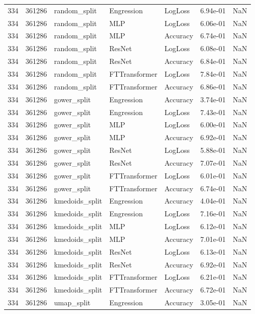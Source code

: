 \begin{tabular}{rrlllrr}
334 & 361286 & random\_split & Engression & LogLoss & 6.94e-01 & NaN \\
334 & 361286 & random\_split & MLP & LogLoss & 6.06e-01 & NaN \\
334 & 361286 & random\_split & MLP & Accuracy & 6.74e-01 & NaN \\
334 & 361286 & random\_split & ResNet & LogLoss & 6.08e-01 & NaN \\
334 & 361286 & random\_split & ResNet & Accuracy & 6.84e-01 & NaN \\
334 & 361286 & random\_split & FTTransformer & LogLoss & 7.84e-01 & NaN \\
334 & 361286 & random\_split & FTTransformer & Accuracy & 6.86e-01 & NaN \\
334 & 361286 & gower\_split & Engression & Accuracy & 3.74e-01 & NaN \\
334 & 361286 & gower\_split & Engression & LogLoss & 7.43e-01 & NaN \\
334 & 361286 & gower\_split & MLP & LogLoss & 6.00e-01 & NaN \\
334 & 361286 & gower\_split & MLP & Accuracy & 6.92e-01 & NaN \\
334 & 361286 & gower\_split & ResNet & LogLoss & 5.88e-01 & NaN \\
334 & 361286 & gower\_split & ResNet & Accuracy & 7.07e-01 & NaN \\
334 & 361286 & gower\_split & FTTransformer & LogLoss & 6.01e-01 & NaN \\
334 & 361286 & gower\_split & FTTransformer & Accuracy & 6.74e-01 & NaN \\
334 & 361286 & kmedoids\_split & Engression & Accuracy & 4.04e-01 & NaN \\
334 & 361286 & kmedoids\_split & Engression & LogLoss & 7.16e-01 & NaN \\
334 & 361286 & kmedoids\_split & MLP & LogLoss & 6.12e-01 & NaN \\
334 & 361286 & kmedoids\_split & MLP & Accuracy & 7.01e-01 & NaN \\
334 & 361286 & kmedoids\_split & ResNet & LogLoss & 6.13e-01 & NaN \\
334 & 361286 & kmedoids\_split & ResNet & Accuracy & 6.92e-01 & NaN \\
334 & 361286 & kmedoids\_split & FTTransformer & LogLoss & 6.21e-01 & NaN \\
334 & 361286 & kmedoids\_split & FTTransformer & Accuracy & 6.72e-01 & NaN \\
334 & 361286 & umap\_split & Engression & Accuracy & 3.05e-01 & NaN \\

\end{tabular}
